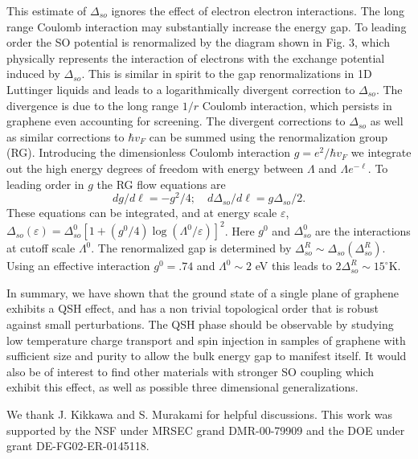 \documentclass[twocolumn,showpacs,floatfix,prl]{revtex4}
\begin{document}
This estimate of $\Delta_{so}$ ignores the effect of electron electron
interactions. The long range Coulomb interaction may
substantially increase the energy gap.  To leading order the SO
potential is renormalized by the diagram shown in Fig. 3, which
physically represents the interaction of electrons with the
exchange potential induced by $\Delta_{so}$.  This is similar in
spirit to the gap renormalizations  in 1D Luttinger liquids and
leads to a logarithmically divergent correction to
$\Delta_{so}$.  The divergence is due to the long range $1/r$
Coulomb interaction, which persists in graphene even accounting
for screening\cite{guinea}.  The divergent corrections to $\Delta_{so}$
as well as similar corrections to $\hbar v_F$ can be
summed using the renormalization group (RG)\cite{guinea}.  Introducing
the dimensionless Coulomb interaction $g = e^2/\hbar v_F$ we
integrate out the high energy degrees of freedom with energy
between $\Lambda$ and $\Lambda e^{-\ell}$.  To leading order in
$g$ the RG flow equations are
\begin{equation}
dg/d\ell = -g^2/4;\quad d\Delta_{so}/d\ell = g\Delta_{so}/2.
\end{equation}
These equations can be integrated, and at energy
scale $\varepsilon$, $\Delta_{so}(\varepsilon) = \Delta_{so}^0 [1 + (g^0/4)
\log(\Lambda^0/\varepsilon)]^2$.  Here $g^0$ and $\Delta_{so}^0$ are the
interactions at cutoff scale $\Lambda^0$.
 The renormalized  gap is
determined by $\Delta_{so}^R\sim\Delta_{so}(\Delta_{so}^R)$.   Using an effective
interaction $g^0 = .74$\cite{kanemele} and $\Lambda^0 \sim 2$ eV this
leads to $2\Delta_{so}^R \sim 15^\circ$K.

In summary, we have shown that the ground state of a single plane of
graphene exhibits a QSH effect, and has a non trivial topological order that is robust
against small perturbations.
The QSH phase should be observable by studying low temperature charge transport and
spin injection in samples of graphene with
sufficient size and purity to allow the bulk energy gap to manifest itself.
It would also be of interest to find other materials with stronger
SO coupling which exhibit this effect, as well as possible
three dimensional generalizations.

We thank J. Kikkawa and S. Murakami for helpful discussions.  This
work was supported by the NSF under MRSEC grand DMR-00-79909 and the
DOE under grant DE-FG02-ER-0145118.
\end{document}
